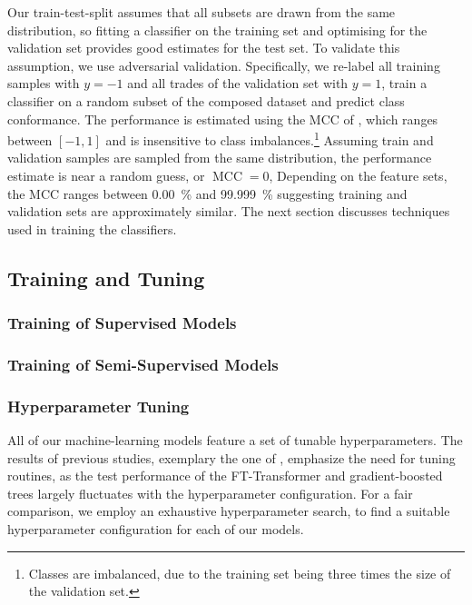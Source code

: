 Our train-test-split assumes that all subsets are drawn from the same distribution, so fitting a classifier on the training set and optimising for the validation set provides good estimates for the test set. To validate this assumption, we use adversarial validation. Specifically, we re-label all training samples with $y=-1$ and all trades of the validation set with $y=1$, train a classifier on a random subset of the composed dataset and predict class conformance. The performance is estimated using the \gls{MCC} of \textcite[][445]{matthewsComparisonPredictedObserved1975}, which ranges between $\left[-1, 1\right]$ and is insensitive to class imbalances.\footnote{Classes are imbalanced, due to the training set being three times the size of the validation set.} Assuming train and validation samples are sampled from the same distribution, the performance estimate is near a random guess, or $\operatorname{MCC} = 0$, Depending on the feature sets, the \gls{MCC} ranges between \SI{0.00}{\percent} and \SI{99.999}{\percent} suggesting training and validation sets are approximately similar. The next section discusses techniques used in training the classifiers.

\subsection{Training and Tuning}\label{sec:training-and-tuning}

\subsubsection{Training of Supervised
    Models}\label{sec:training-of-supervised-models}


\subsubsection{Training of Semi-Supervised
    Models}\label{sec:training-of-semi-supervised-models}


\subsubsection{Hyperparameter Tuning}\label{sec:hyperparameter-tuning}

All of our machine-learning models feature a set of tunable hyperparameters. The results of previous studies, exemplary the one of \textcite[][5]{grinsztajnWhyTreebasedModels2022}, emphasize the need for tuning routines, as the test performance of the FT-Transformer and gradient-boosted trees largely fluctuates with the hyperparameter configuration. For a fair comparison, we employ an exhaustive hyperparameter search, to find a suitable hyperparameter configuration for each of our models.

